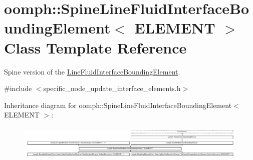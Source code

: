\hypertarget{classoomph_1_1SpineLineFluidInterfaceBoundingElement}{}\section{oomph\+:\+:Spine\+Line\+Fluid\+Interface\+Bounding\+Element$<$ E\+L\+E\+M\+E\+NT $>$ Class Template Reference}
\label{classoomph_1_1SpineLineFluidInterfaceBoundingElement}


Spine version of the \hyperlink{classoomph_1_1LineFluidInterfaceBoundingElement}{Line\+Fluid\+Interface\+Bounding\+Element}.  




{\ttfamily \#include $<$specific\+\_\+node\+\_\+update\+\_\+interface\+\_\+elements.\+h$>$}

Inheritance diagram for oomph\+:\+:Spine\+Line\+Fluid\+Interface\+Bounding\+Element$<$ E\+L\+E\+M\+E\+NT $>$\+:\begin{figure}[H]
\begin{center}
\leavevmode
\includegraphics[height=1.707317cm]{classoomph_1_1SpineLineFluidInterfaceBoundingElement}
\end{center}
\end{figure}
